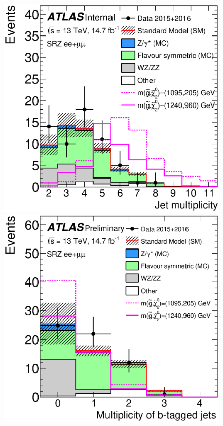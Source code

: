 \begin{centering}
\begin{figure}[!hbt]
\includegraphics[width=.48\linewidth]{figures/results/njets_ee_mm_srz_R_a.eps}
\includegraphics[width=.48\linewidth]{figures/results/nbjets_ee_mm_srz_R_a.eps}
\caption{ }
\label{fig:results_srdists}
\end{figure}
\end{centering}

